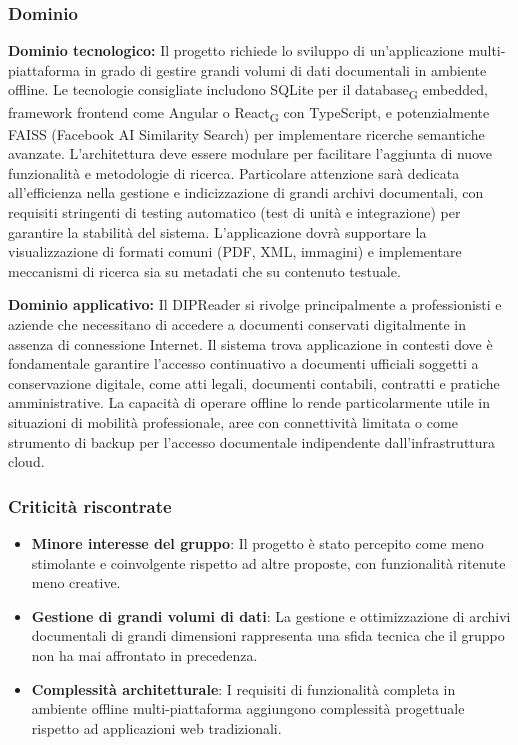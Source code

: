 \documentclass[11pt,a4paper]{article}
\newcommand{\gls}[1]{#1\textsubscript{G}}
\begin{document}
\subsubsection{Dominio}
\textbf{Dominio tecnologico:} Il progetto richiede lo sviluppo di un'applicazione multi-piattaforma in grado di gestire grandi volumi di dati documentali in ambiente offline. Le tecnologie consigliate includono SQLite per il \gls{database} embedded, framework frontend come Angular o \gls{React} con TypeScript, e potenzialmente FAISS (Facebook AI Similarity Search) per implementare ricerche semantiche avanzate. L'architettura deve essere modulare per facilitare l'aggiunta di nuove funzionalità e metodologie di ricerca. Particolare attenzione sarà dedicata all'efficienza nella gestione e indicizzazione di grandi archivi documentali, con requisiti stringenti di testing automatico (test di unità e integrazione) per garantire la stabilità del sistema. L'applicazione dovrà supportare la visualizzazione di formati comuni (PDF, XML, immagini) e implementare meccanismi di ricerca sia su metadati che su contenuto testuale.

\vspace{0.5cm}

\noindent  \textbf{Dominio applicativo:} Il DIPReader si rivolge principalmente a professionisti e aziende che necessitano di accedere a documenti conservati digitalmente in assenza di connessione Internet. Il sistema trova applicazione in contesti dove è fondamentale garantire l'accesso continuativo a documenti ufficiali soggetti a conservazione digitale, come atti legali, documenti contabili, contratti e pratiche amministrative. La capacità di operare offline lo rende particolarmente utile in situazioni di mobilità professionale, aree con connettività limitata o come strumento di backup per l'accesso documentale indipendente dall'infrastruttura cloud.

\subsubsection{Criticità riscontrate}
\begin{itemize}
    \item \textbf{Minore interesse del gruppo}: Il progetto è stato percepito come meno stimolante e coinvolgente rispetto ad altre proposte, con funzionalità ritenute meno creative.
    \item \textbf{Gestione di grandi volumi di dati}: La gestione e ottimizzazione di archivi documentali di grandi dimensioni rappresenta una sfida tecnica che il gruppo non ha mai affrontato in precedenza.
    \item \textbf{Complessità architetturale}: I requisiti di funzionalità completa in ambiente offline multi-piattaforma aggiungono complessità progettuale rispetto ad applicazioni web tradizionali.
\end{itemize}
\end{document}
